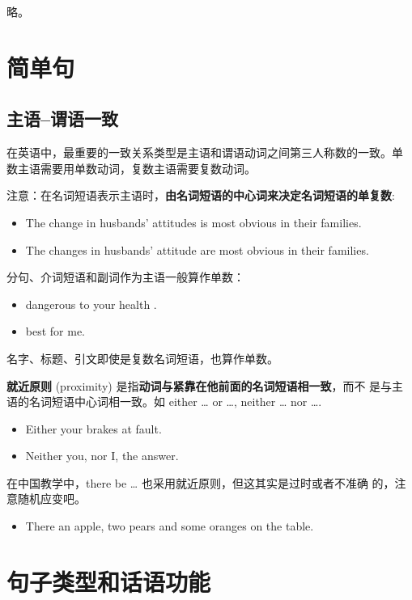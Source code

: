 略。


\section{简单句}

\subsection{主语--谓语一致}

在英语中，最重要的一致关系类型是主语和谓语动词之间第三人称数的一致。单
数主语需要用单数动词，复数主语需要复数动词。

注意：在名词短语表示主语时，\textbf{由名词短语的中心词来决定名词短语的单复数}:
\begin{itemize}
\item The change in husbands' attitudes is most obvious in their families.
\item The changes in husbands' attitude are most obvious in their families.
\end{itemize}

分句、介词短语和副词作为主语一般算作单数：
\begin{itemize}
\item {}  dangerous to your health .

\item {}  best for me.
\end{itemize}

名字、标题、引文即使是复数名词短语，也算作单数。

\textbf{就近原则} (proximity) 是指\textbf{动词与紧靠在他前面的名词短语相一致}，而不
是与主语的名词短语中心词相一致。如 either \ldots{} or \ldots{},
neither \ldots{} nor \ldots{}.
\begin{itemize}
\item Either your brakes   at fault.
\item Neither you, nor I,   the answer.
\end{itemize}

在中国教学中，there be \ldots{} 也采用就近原则，但这其实是过时或者不准确
的，注意随机应变吧。
\begin{itemize}
\item There  an apple, two pears and some oranges on the table.
\end{itemize}

\section{句子类型和话语功能}

